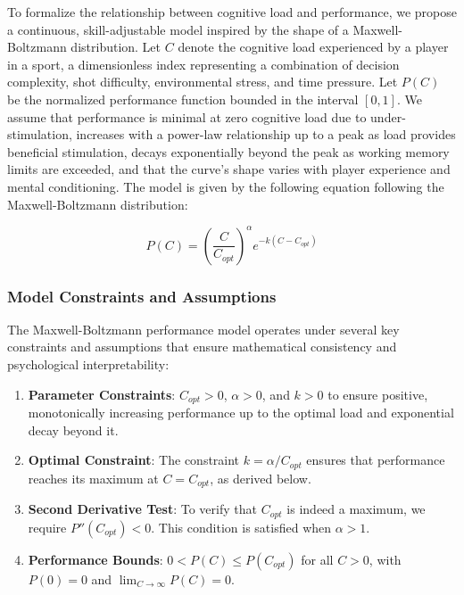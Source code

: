 \documentclass{article}
\begin{document}
To formalize the relationship between cognitive load and performance, we propose a continuous, skill-adjustable model
inspired by the shape of a Maxwell-Boltzmann distribution. Let $C$ denote the cognitive load experienced by a player in
a sport, a dimensionless index representing a combination of decision complexity, shot difficulty, environmental stress,
and time pressure. Let $P(C)$ be the normalized performance function bounded in the interval $[0, 1]$. We assume that
performance is minimal at zero cognitive load due to under-stimulation, increases with a power-law relationship up to a
peak as load provides beneficial stimulation, decays exponentially beyond the peak as working memory limits are
exceeded, and that the curve's shape varies with player experience and mental conditioning.  The model is given by the
following equation following the Maxwell-Boltzmann distribution:

\begin{equation}
    P(C) = \left(\frac{C}{C_{opt}}\right)^{\alpha}e^{-k (C - C_{opt})}
    \label{eq:performance_model}
\end{equation}

\subsubsection*{Model Constraints and Assumptions}
The Maxwell-Boltzmann performance model operates under several key constraints and assumptions that ensure mathematical 
consistency and psychological interpretability:

\begin{enumerate}
    \item \textbf{Parameter Constraints}: $C_{opt} > 0$, $\alpha > 0$, and $k > 0$ to ensure positive, 
    monotonically increasing performance up to the optimal load and exponential decay beyond it.
    
    \item \textbf{Optimal Constraint}: The constraint $k = \alpha/C_{opt}$ ensures that performance 
    reaches its maximum at $C = C_{opt}$, as derived below.
    
    \item \textbf{Second Derivative Test}: To verify that $C_{opt}$ is indeed a maximum, we require 
    $P''(C_{opt}) < 0$. This condition is satisfied when $\alpha > 1$.
    
    \item \textbf{Performance Bounds}: $0 < P(C) \leq P(C_{opt})$ for all $C > 0$, with 
    $P(0) = 0$ and $\lim_{C \to \infty} P(C) = 0$.
\end{enumerate}
\end{document}

